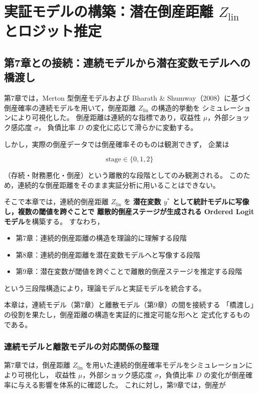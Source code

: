 \chapter{実証モデルの構築：潜在倒産距離 $Z_{\text{lin}}$ とロジット推定}
\label{chap:latent_default_distance}

\section*{第7章との接続：連続モデルから潜在変数モデルへの橋渡し}

第7章では，Merton 型倒産モデルおよび Bharath \& Shumway（2008）に基づく
倒産確率の連続モデルを用いて，倒産距離 $Z_{\text{lin}}$ の構造的挙動を
シミュレーションにより可視化した。
倒産距離は連続的な指標であり，収益性 $\mu$，外部ショック感応度 $\sigma$，
負債比率 $D$ の変化に応じて滑らかに変動する。

しかし，実際の倒産データでは倒産確率そのものは観測できず，
企業は


\[
\text{stage} \in \{0,1,2\}
\]


（存続・財務悪化・倒産）という離散的な段階としてのみ観測される。
このため，連続的な倒産距離をそのまま実証分析に用いることはできない。

そこで本章では，連続的倒産距離 $Z_{\text{lin}}$ を
\textbf{潜在変数 $y^*$ として統計モデルに写像し，複数の閾値を跨ぐことで
離散的倒産ステージが生成される Ordered Logit モデル}を構築する。
すなわち，

\begin{itemize}
    \item 第7章：連続的倒産距離の構造を理論的に理解する段階
    \item 第8章：連続的倒産距離を潜在変数モデルへと写像する段階
    \item 第9章：潜在変数が閾値を跨ぐことで離散的倒産ステージを推定する段階
\end{itemize}

という三段階構造により，理論モデルと実証モデルを統合する。

本章は，連続モデル（第7章）と離散モデル（第9章）の間を接続する
「橋渡し」の役割を果たし，倒産距離の構造を実証的に推定可能な形へと
定式化するものである。

\subsection*{連続モデルと離散モデルの対応関係の整理}

第7章では，倒産距離 $Z_{\text{lin}}$ を用いた連続的倒産確率モデルをシミュレーションにより可視化し，
収益性 $\mu$，外部ショック感応度 $\sigma$，負債比率 $D$ の変化が倒産確率に与える影響を体系的に確認した。
これに対し，第9章では，倒産が


